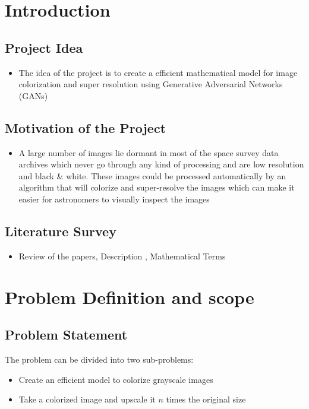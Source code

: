 \documentclass[oneside,a4paper,12pt]{report}
\begin{document}
\setlength{\parindent}{11mm}





\chapter{Introduction}
\section{Project Idea}
\begin{itemize}
\item The idea of the project is to create a efficient mathematical model for image colorization and super resolution using Generative Adversarial Networks (GANs)
\end{itemize}


\section{Motivation of the Project}
\begin{itemize}
\item A large number of images lie dormant in most of the space survey data archives which never go through any kind of processing and are low resolution and black \& white. These images could be processed automatically by an algorithm that will colorize and super-resolve the images which can make it easier for astronomers to visually inspect the images
\end{itemize}

\section{Literature Survey}
\begin{itemize}
\item Review of the papers, Description , Mathematical Terms
\end{itemize}


\chapter{Problem Definition and scope}
\section{Problem Statement}
The problem can be divided into two sub-problems:
\begin{itemize}
	\item Create an efficient model to colorize grayscale images
	\item Take a colorized image and upscale it $n$ times the original size
\end{itemize}
\end{document}
